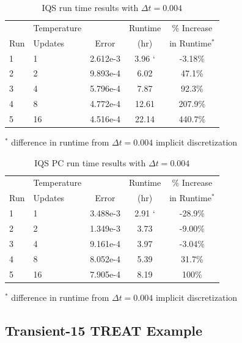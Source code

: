 \documentclass{anstrans}
\begin{document}
\begin{table}[!htbp]
\begin{center}
\begin{tabular}{|l|l|ccc|}
\hline
	&  Temperature 	&  		& Runtime 	& \% Increase	\\
Run	&  Updates 	& Error & (hr)		& in Runtime$^*$\\
\hline
1	& 1		& 2.612e-3 	& 3.96 `& -3.18\%	\\
2	& 2		& 9.893e-4 	& 6.02	&  47.1\%	\\
3 	& 4 	& 5.796e-4 	& 7.87	&  92.3\%	\\
4 	& 8 	& 4.772e-4 	& 12.61	& 207.9\% 	\\
5 	& 16	& 4.516e-4 	& 22.14	& 440.7\%	\\
\hline
\end{tabular}
\end{center}
\vspace{-3mm}
$^*$ difference in runtime from $\Delta t = 0.004$ implicit discretization 
\caption{IQS run time results with $\Delta t = 0.004$}
\label{tab:iqs_lra}
\end{table}

\begin{table}[!htbp]
\begin{center}
\begin{tabular}{|l|l|ccc|}
\hline
	&  Temperature 	&  		& Runtime 	& \% Increase	\\
Run	&  Updates 	& Error & (hr)		& in Runtime$^*$\\
\hline
1	& 1		& 3.488e-3 	& 2.91 `& -28.9\%	\\
2	& 2		& 1.349e-3 	& 3.73	& -9.00\%	\\
3 	& 4 	& 9.161e-4 	& 3.97	& -3.04\%	\\
4 	& 8 	& 8.052e-4 	& 5.39	&  31.7\%	\\
5 	& 16	& 7.905e-4 	& 8.19	&  100\%	\\
\hline
\end{tabular}
\end{center}
\vspace{-3mm}
$^*$ difference in runtime from $\Delta t = 0.004$ implicit discretization 
\caption{IQS PC run time results with $\Delta t = 0.004$}
\label{tab:iqspc_lra}
\end{table}

\subsection{Transient-15 TREAT Example}
\end{document}
